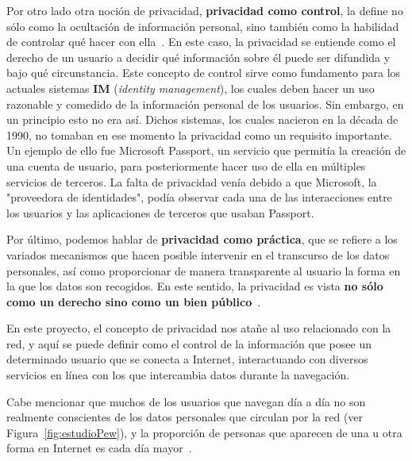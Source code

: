 Por otro lado otra noción de privacidad, \textbf{privacidad como
  control}, la define no sólo como la ocultación de información
personal, sino también como la habilidad de controlar qué hacer con
ella~\cite{lane2014privacy}.  En este caso, la privacidad se entiende
como el derecho de un usuario a decidir qué información sobre él puede
ser difundida y bajo qué circunstancia. Este concepto de control sirve
como fundamento para los actuales sistemas
\textbf{IM} (\textit{identity management}), los cuales deben hacer un
uso razonable y comedido de la información personal de los
usuarios. Sin embargo, en un principio esto no era así.  Dichos
sistemas, los cuales nacieron en la década de 1990, no tomaban en ese
momento la privacidad como un requisito importante. Un ejemplo de ello
fue Microsoft Passport, un servicio que permitía la creación de una
cuenta de usuario, para posteriormente hacer uso de ella en múltiples
servicios de terceros. La falta de privacidad venía debido a que
Microsoft, la "proveedora de identidades", podía observar cada una de
las interacciones entre los usuarios y las aplicaciones de terceros
que usaban Passport.

Por último, podemos hablar de \textbf{privacidad como práctica}, que
se refiere a los variados mecanismos que hacen posible intervenir en
el transcurso de los datos personales, así como proporcionar de manera
transparente al usuario la forma en la que los datos son recogidos. En
este sentido, la privacidad es vista \textbf{no sólo como un derecho
  sino como un bien público}~\cite{lane2014privacy}.

En este proyecto, el concepto de privacidad nos atañe al uso
relacionado con la red, y aquí se puede definir como el control de la
información que posee un determinado usuario que se conecta a
Internet, interactuando con diversos servicios en línea con los que
intercambia datos durante la navegación.

Cabe mencionar que muchos de los usuarios que navegan día a día no son
realmente conscientes de los datos personales que circulan por la red (ver Figura~\ref{fig:estudioPew}),
y la proporción de personas que aparecen de una u otra forma en
Internet es cada día mayor~\cite{article:concernidos}.

